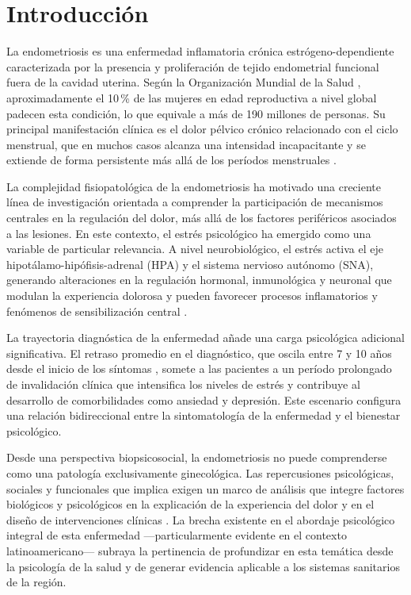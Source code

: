 \documentclass[12pt, a4paper]{article}
\begin{document}
\section{Introducción}

La endometriosis es una enfermedad inflamatoria crónica estrógeno-dependiente caracterizada
por la presencia y proliferación de tejido endometrial funcional fuera de la cavidad uterina.
Según la Organización Mundial de la Salud \parencite{WHO2023}, aproximadamente el 10\,\% de
las mujeres en edad reproductiva a nivel global padecen esta condición, lo que equivale a más
de 190 millones de personas. Su principal manifestación clínica es el dolor pélvico crónico
relacionado con el ciclo menstrual, que en muchos casos alcanza una intensidad incapacitante y
se extiende de forma persistente más allá de los períodos menstruales \parencite{Zondervan2020}.

La complejidad fisiopatológica de la endometriosis ha motivado una creciente línea de
investigación orientada a comprender la participación de mecanismos centrales en la regulación
del dolor, más allá de los factores periféricos asociados a las lesiones. En este contexto, el
estrés psicológico ha emergido como una variable de particular relevancia. A nivel
neurobiológico, el estrés activa el eje hipotálamo-hipófisis-adrenal (HPA) y el sistema
nervioso autónomo (SNA), generando alteraciones en la regulación hormonal, inmunológica y
neuronal que modulan la experiencia dolorosa y pueden favorecer procesos inflamatorios y
fenómenos de sensibilización central \parencite{Appleyard2020, Maddern2020}.

La trayectoria diagnóstica de la enfermedad añade una carga psicológica adicional
significativa. El retraso promedio en el diagnóstico, que oscila entre 7 y 10 años desde el
inicio de los síntomas \parencite{Nnoaham2011}, somete a las pacientes a un período prolongado
de invalidación clínica que intensifica los niveles de estrés y contribuye al desarrollo de
comorbilidades como ansiedad y depresión. Este escenario configura una relación bidireccional
entre la sintomatología de la enfermedad y el bienestar psicológico.

Desde una perspectiva biopsicosocial, la endometriosis no puede comprenderse como una
patología exclusivamente ginecológica. Las repercusiones psicológicas, sociales y funcionales
que implica exigen un marco de análisis que integre factores biológicos y psicológicos en la
explicación de la experiencia del dolor y en el diseño de intervenciones clínicas
\parencite{Szypłowska2023}. La brecha existente en el abordaje psicológico integral de
esta enfermedad —particularmente evidente en el contexto latinoamericano— subraya la
pertinencia de profundizar en esta temática desde la psicología de la salud y de generar
evidencia aplicable a los sistemas sanitarios de la región.
\end{document}
